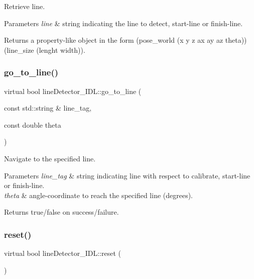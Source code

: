 Retrieve line. 


\begin{DoxyParams}{Parameters}
{\em line} & string indicating the line to detect, start-\/line or finish-\/line. \\
\hline
\end{DoxyParams}
\begin{DoxyReturn}{Returns}
a property-\/like object in the form (pose\+\_\+world (x y z ax ay az theta)) (line\+\_\+size (lenght width)). 
\end{DoxyReturn}
\mbox{\label{classlineDetector__IDL_af8af05e2ad1ad143c42d5229242bc7f3}} 
\subsubsection{\texorpdfstring{go\+\_\+to\+\_\+line()}{go\_to\_line()}}
{\footnotesize\ttfamily virtual bool line\+Detector\+\_\+\+I\+D\+L\+::go\+\_\+to\+\_\+line (\begin{DoxyParamCaption}\item[{const std\+::string \&}]{line\+\_\+tag,  }\item[{const double}]{theta }\end{DoxyParamCaption})\hspace{0.3cm}{\ttfamily [virtual]}}



Navigate to the specified line. 


\begin{DoxyParams}{Parameters}
{\em line\+\_\+tag} & string indicating line with respect to calibrate, start-\/line or finish-\/line. \\
\hline
{\em theta} & angle-\/coordinate to reach the specified line (degrees). \\
\hline
\end{DoxyParams}
\begin{DoxyReturn}{Returns}
true/false on success/failure. 
\end{DoxyReturn}
\mbox{\label{classlineDetector__IDL_a665153eb57fa761fe6dd9ae741169f7b}} 
\subsubsection{\texorpdfstring{reset()}{reset()}}
{\footnotesize\ttfamily virtual bool line\+Detector\+\_\+\+I\+D\+L\+::reset (\begin{DoxyParamCaption}{ }\end{DoxyParamCaption})\hspace{0.3cm}{\ttfamily [virtual]}}



